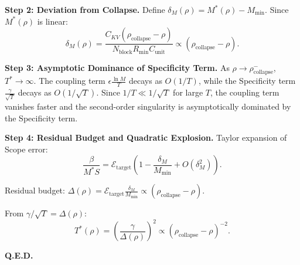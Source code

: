 \documentclass[11pt,a4paper]{article}
\theoremstyle{plain}
\theoremstyle{definition}
\theoremstyle{remark}
\begin{document}
\textbf{Step 2: Deviation from Collapse.} Define $\delta_M(\rho) = M^*(\rho) - M_{\min}$. Since $M^*(\rho)$ is linear:
$$ \delta_M(\rho) = \frac{C_{KV}(\rho_{\text{collapse}} - \rho)}{N_{\text{block}} R_{\min} C_{\text{unit}}} \propto (\rho_{\text{collapse}} - \rho). $$

\textbf{Step 3: Asymptotic Dominance of Specificity Term.} As $\rho \to \rho_{\text{collapse}}^-$, $T^* \to \infty$. The coupling term $\epsilon \frac{\ln M}{T}$ decays as $O(1/T)$, while the Specificity term $\frac{\gamma}{\sqrt{T}}$ decays as $O(1/\sqrt{T})$. Since $1/T \ll 1/\sqrt{T}$ for large $T$, the coupling term vanishes faster and the second-order singularity is asymptotically dominated by the Specificity term.

\textbf{Step 4: Residual Budget and Quadratic Explosion.} Taylor expansion of Scope error:
$$ \frac{\beta}{M^* S} = \mathcal{E}_{\text{target}} \left(1 - \frac{\delta_M}{M_{\min}} + O(\delta_M^2)\right). $$

Residual budget: $\Delta(\rho) = \mathcal{E}_{\text{target}} \frac{\delta_M}{M_{\min}} \propto (\rho_{\text{collapse}} - \rho)$.

From $\gamma/\sqrt{T} = \Delta(\rho)$:
$$ T^*(\rho) = \left(\frac{\gamma}{\Delta(\rho)}\right)^2 \propto (\rho_{\text{collapse}} - \rho)^{-2}. $$

\textbf{Q.E.D.}
\end{document}
